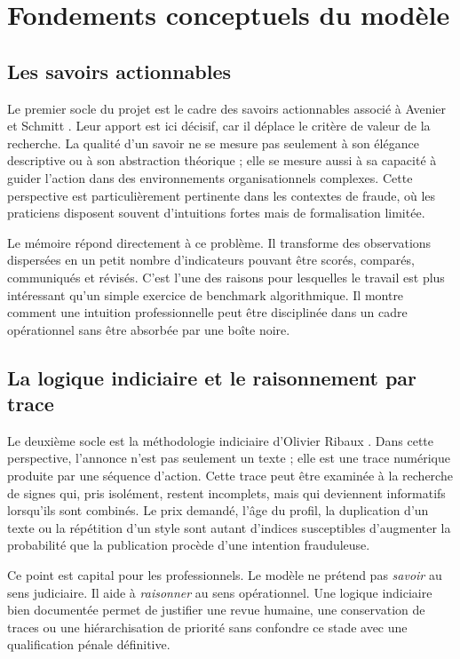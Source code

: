 \documentclass[10pt,a4paper]{article}
\begin{document}
\section{Fondements conceptuels du modèle}
\subsection{Les savoirs actionnables}
Le premier socle du projet est le cadre des savoirs actionnables associé à Avenier et Schmitt \cite{avenier2007a,avenier2007b}. Leur apport est ici décisif, car il déplace le critère de valeur de la recherche. La qualité d'un savoir ne se mesure pas seulement à son élégance descriptive ou à son abstraction théorique ; elle se mesure aussi à sa capacité à guider l'action dans des environnements organisationnels complexes. Cette perspective est particulièrement pertinente dans les contextes de fraude, où les praticiens disposent souvent d'intuitions fortes mais de formalisation limitée.

Le mémoire répond directement à ce problème. Il transforme des observations dispersées en un petit nombre d'indicateurs pouvant être scorés, comparés, communiqués et révisés. C'est l'une des raisons pour lesquelles le travail est plus intéressant qu'un simple exercice de benchmark algorithmique. Il montre comment une intuition professionnelle peut être disciplinée dans un cadre opérationnel sans être absorbée par une boîte noire.

\subsection{La logique indiciaire et le raisonnement par trace}
Le deuxième socle est la méthodologie indiciaire d'Olivier Ribaux \cite{ribaux2023}. Dans cette perspective, l'annonce n'est pas seulement un texte ; elle est une trace numérique produite par une séquence d'action. Cette trace peut être examinée à la recherche de signes qui, pris isolément, restent incomplets, mais qui deviennent informatifs lorsqu'ils sont combinés. Le prix demandé, l'âge du profil, la duplication d'un texte ou la répétition d'un style sont autant d'indices susceptibles d'augmenter la probabilité que la publication procède d'une intention frauduleuse.

Ce point est capital pour les professionnels. Le modèle ne prétend pas \emph{savoir} au sens judiciaire. Il aide à \emph{raisonner} au sens opérationnel. Une logique indiciaire bien documentée permet de justifier une revue humaine, une conservation de traces ou une hiérarchisation de priorité sans confondre ce stade avec une qualification pénale définitive.
\end{document}
